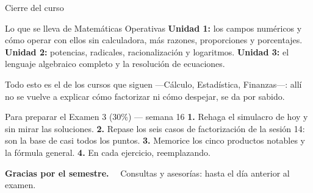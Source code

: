 \documentclass[aspectratio=169,10pt]{beamer}
\begin{document}
\begin{frame}{Cierre del curso}
  \scriptsize
  \begin{block}{Lo que se lleva de Matemáticas Operativas}
    \tiny
    \textbf{Unidad 1:} los campos numéricos y cómo operar con ellos sin
    calculadora, más razones, proporciones y porcentajes. \quad
    \textbf{Unidad 2:} potencias, radicales, racionalización y logaritmos.
    \quad
    \textbf{Unidad 3:} el lenguaje algebraico completo y la resolución de
    ecuaciones.

    \vspace{0.06cm}
    Todo esto es el  de los cursos que
    siguen —Cálculo, Estadística, Finanzas—: allí no se vuelve a explicar cómo
    factorizar ni cómo despejar, se da por sabido.
  \end{block}

  \vspace{0.1cm}
  \begin{alertblock}{Para preparar el Examen 3 (30\%) — semana 16}
    \tiny
    \textbf{1.} Rehaga el simulacro de hoy  y sin mirar las
    soluciones. \quad
    \textbf{2.} Repase los seis casos de factorización de la sesión 14: son la
    base de casi todos los puntos. \quad
    \textbf{3.} Memorice los cinco productos notables y la fórmula general.
    \quad
    \textbf{4.} En cada ejercicio,  reemplazando.
  \end{alertblock}

  \vspace{0.08cm}
  \begin{center}
    {\footnotesize\color{uniAzul}\textbf{Gracias por el semestre.}
    \ \ Consultas y asesorías: hasta el día anterior al examen.}
  \end{center}
\end{frame}
\end{document}
